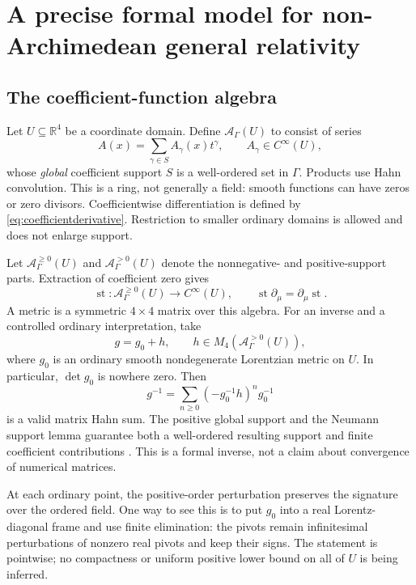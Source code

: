 \documentclass[11pt,a4paper]{article}
\numberwithin{equation}{section}
\theoremstyle{definition}
\theoremstyle{remark}
\newcommand{\R}{\mathbb R}
\newcommand{\Alg}{\mathcal A_{\Gamma}}
\DeclareMathOperator{\st}{st}
\begin{document}
\section{A precise formal model for non-Archimedean general relativity}
\label{sec:formalgr}

\subsection{The coefficient-function algebra}
Let $U\subseteq\R^4$ be a coordinate domain. Define $\Alg(U)$ to consist of series
\begin{equation}
 A(x)=\sum_{\gamma\in S}A_\gamma(x)t^\gamma,
 \qquad A_\gamma\in C^\infty(U),
\end{equation}
whose \emph{global} coefficient support $S$ is a well-ordered set in $\Gamma$. Products use Hahn convolution. This is a ring, not generally a field: smooth functions can have zeros or zero divisors. Coefficientwise differentiation is defined by \eqref{eq:coefficientderivative}. Restriction to smaller ordinary domains is allowed and does not enlarge support.

Let $\Alg^{\geq0}(U)$ and $\Alg^{>0}(U)$ denote the nonnegative- and positive-support parts. Extraction of coefficient zero gives
\begin{equation}
 \st:\Alg^{\geq0}(U)\longrightarrow C^\infty(U),
 \qquad \st\partial_\mu=\partial_\mu\st.
\end{equation}
A metric is a symmetric $4\times4$ matrix over this algebra. For an inverse and a controlled ordinary interpretation, take
\begin{equation}\label{eq:metricdeformation}
 g=g_0+h,\qquad h\in M_4(\Alg^{>0}(U)),
\end{equation}
where $g_0$ is an ordinary smooth nondegenerate Lorentzian metric on $U$. In particular, $\det g_0$ is nowhere zero. Then
\begin{equation}\label{eq:inversemetric}
 g^{-1}=\sum_{n\geq0}(-g_0^{-1}h)^n g_0^{-1}
\end{equation}
is a valid matrix Hahn sum. The positive global support and the Neumann support lemma guarantee both a well-ordered resulting support and finite coefficient contributions \cite{Repo}. This is a formal inverse, not a claim about convergence of numerical matrices.

At each ordinary point, the positive-order perturbation preserves the signature over the ordered field. One way to see this is to put $g_0$ into a real Lorentz-diagonal frame and use finite elimination: the pivots remain infinitesimal perturbations of nonzero real pivots and keep their signs. The statement is pointwise; no compactness or uniform positive lower bound on all of $U$ is being inferred.
\end{document}
